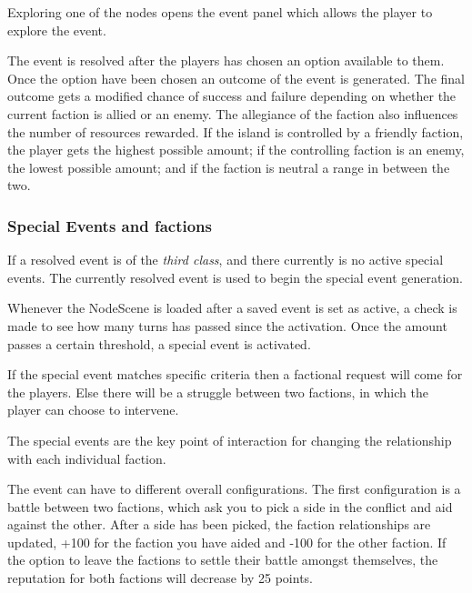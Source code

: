 Exploring one of the nodes opens the event panel which allows the player to explore the event. 

The event is resolved after the players has chosen an option available to them. Once the option have been chosen an outcome of the event is generated.
The final outcome gets a modified chance of success and failure depending on whether the current faction is allied or an enemy. 
The allegiance of the faction also influences the number of resources rewarded. If the island is controlled by a friendly faction, the player gets the highest possible amount; if the controlling faction is an enemy, the lowest possible amount; and if the faction is neutral a range in between the two.

\subsubsection{Special Events and factions}
If a resolved event is of the \textit{third class}, and there currently is no active special events. The currently resolved event is used to begin the special event generation.

Whenever the NodeScene is loaded after a saved event is set as active, a check is made to see how many turns has passed since the activation. Once the amount passes a certain threshold, a special event is activated.

If the special event matches specific criteria then a factional request will come for the players. Else there will be a struggle between two factions, in which the player can choose to intervene.

The special events are the key point of interaction for changing the relationship with each individual faction.

The event can have to different overall configurations.
The first configuration is a battle between two factions, which ask you to pick a side in the conflict and aid against the other.
After a side has been picked, the faction relationships are updated, +100 for the faction you have aided and -100 for the other faction. If the option to leave the factions to settle their battle amongst themselves, the reputation for both factions will decrease by 25 points.

